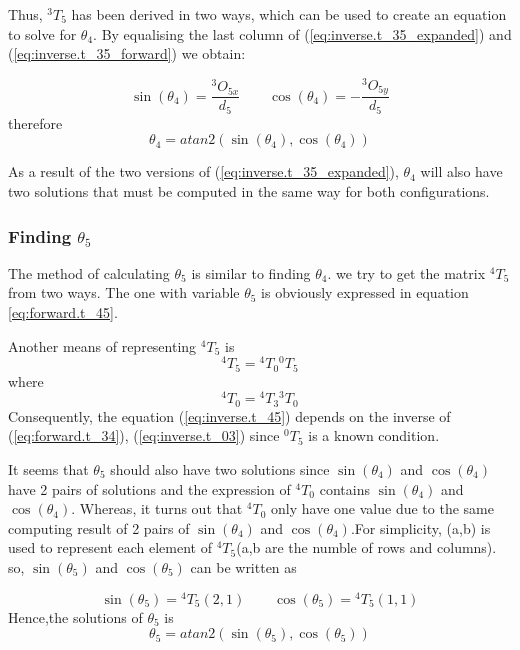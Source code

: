 \documentclass{article}
\renewcommand{\c}[1]{\cos(\theta_{#1})}
\newcommand{\s}[1]{\sin(\theta_{#1})}
\newcommand{\T}[2]{{}^{#1}T_{#2}}
\renewcommand{\O}[2]{{}^{#1}O_{#2}}
\begin{document}
Thus, $\T{3}{5}$ has been derived in two ways, which can be used to create an equation to solve for $\theta_4$. By equalising the last column of (\ref{eq:inverse.t_35_expanded}) and (\ref{eq:inverse.t_35_forward}) we obtain:

\begin{equation}
\s{4} = \frac{\O{3}{5x}}{d_5}
\qquad
\c{4} = -\frac{\O{3}{5y}}{d_5}
\end{equation}
therefore
\begin{equation}
\theta_{4} = atan2(\s{4},\c{4})
\end{equation}

As a result of the two versions of (\ref{eq:inverse.t_35_expanded}), $\theta_4$ will also have two solutions that must be computed in the same way for both configurations.

\subsubsection{Finding $\theta_5$}
The method of calculating $\theta_5$ is similar to finding $\theta_4$. we try to get the matrix  $\T{4}{5}$ from two ways. The one with variable $\theta_5$ is obviously expressed in equation \ref{eq:forward.t_45}.

Another means of representing $\T{4}{5}$ is 
\begin{equation}
\label{eq:inverse.t_45}
\T{4}{5} = \T{4}{0} \T{0}{5}
\end{equation}
where
\begin{equation*}
\T{4}{0} = \T{4}{3}\T{3}{0}
\end{equation*}
Consequently, the equation (\ref{eq:inverse.t_45}) depends on the inverse of (\ref{eq:forward.t_34}), (\ref{eq:inverse.t_03}) since $\T{0}{5}$ is a known condition. 

It seems that $\theta_5$ should also have two solutions since $\s{4}$ and $\c{4}$ have 2 pairs of solutions and the expression of $\T{4}{0}$ contains $\s{4}$ and $\c{4}$. Whereas, it turns out that $\T{4}{0}$ only have one value due to the same computing result of 2 pairs of $\s{4}$ and $\c{4}$.For simplicity, (a,b) is used to represent each element of $\T{4}{5}$(a,b are the numble of rows and columns). so, $\s{5}$ and $\c{5}$ can be written as

\begin{equation}
\s{5} = \T{4}{5}(2,1)
\qquad
\c{5} = \T{4}{5}(1,1)
\end{equation}
Hence,the solutions of $\theta_5$ is
\begin{equation}
\theta_{5} = atan2(\s{5},\c{5})
\end{equation}
\end{document}
